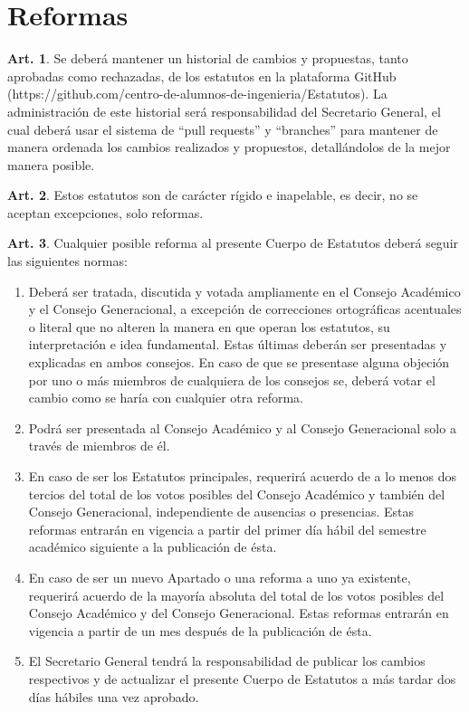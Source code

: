 \documentclass[letterpaper,11pt]{article}
\theoremstyle{definition}%
\newtheorem{art}{Art.} %
\begin{document}
\section{Reformas}\label{reformas}

\begin{art}
	Se deberá mantener un historial de cambios y propuestas, tanto aprobadas como rechazadas, de los estatutos en la plataforma GitHub (https://github.com/centro-de-alumnos-de-ingenieria/Estatutos). La administración de este historial será responsabilidad del Secretario General, el cual deberá usar el sistema de “pull requests” y “branches” para mantener de manera ordenada los cambios realizados y propuestos, detallándolos de la mejor manera posible.
\end{art}

\begin{art}
	Estos estatutos son de carácter rígido e inapelable, es decir, no se aceptan excepciones, solo reformas.
\end{art}

\begin{art}\label{normaReforma}
	Cualquier posible reforma al presente Cuerpo de Estatutos deberá seguir las siguientes normas:
	\begin{enumerate}
		\item Deberá ser tratada, discutida y votada ampliamente en el Consejo Académico y el Consejo Generacional, a excepción de correcciones ortográficas acentuales o literal que no alteren la manera en que operan los estatutos, su interpretación e idea fundamental. Estas últimas deberán ser presentadas y explicadas en ambos consejos. En caso de que se presentase alguna objeción por uno o más miembros de cualquiera de los consejos se, deberá votar el cambio como se haría con cualquier otra reforma.

		\item  Podrá ser presentada al Consejo Académico y al Consejo Generacional solo a través de miembros de él.

		\item  En caso de ser los Estatutos principales, requerirá acuerdo de a lo menos dos tercios del total de los votos posibles del Consejo Académico y también del Consejo Generacional, independiente de ausencias o presencias. Estas reformas entrarán en vigencia a partir del primer día hábil del semestre académico siguiente a la publicación de ésta.

		\item  En caso de ser un nuevo Apartado o una reforma a uno ya existente, requerirá acuerdo de la mayoría absoluta del total de los votos posibles del Consejo Académico y del Consejo Generacional. Estas reformas entrarán en vigencia a partir de un mes después de la publicación de ésta.
		\item  El Secretario General tendrá la responsabilidad de publicar los cambios respectivos y de actualizar el presente Cuerpo de Estatutos a más tardar dos días hábiles una vez aprobado.
	\end{enumerate}
\end{art}
\end{document}
